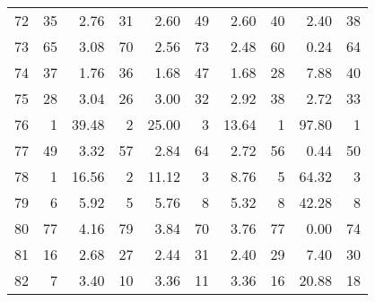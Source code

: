 \begin{table}[ht]
\begin{tabular}{rrrrrrrrrr}
  72 &  35 & 2.76 &  31 & 2.60 &  49 & 2.60 &  40 & 2.40 &  38 \\ 
  73 &  65 & 3.08 &  70 & 2.56 &  73 & 2.48 &  60 & 0.24 &  64 \\ 
  74 &  37 & 1.76 &  36 & 1.68 &  47 & 1.68 &  28 & 7.88 &  40 \\ 
  75 &  28 & 3.04 &  26 & 3.00 &  32 & 2.92 &  38 & 2.72 &  33 \\ 
  76 &   1 & 39.48 &   2 & 25.00 &   3 & 13.64 &   1 & 97.80 &   1 \\ 
  77 &  49 & 3.32 &  57 & 2.84 &  64 & 2.72 &  56 & 0.44 &  50 \\ 
  78 &   1 & 16.56 &   2 & 11.12 &   3 & 8.76 &   5 & 64.32 &   3 \\ 
  79 &   6 & 5.92 &   5 & 5.76 &   8 & 5.32 &   8 & 42.28 &   8 \\ 
  80 &  77 & 4.16 &  79 & 3.84 &  70 & 3.76 &  77 & 0.00 &  74 \\ 
  81 &  16 & 2.68 &  27 & 2.44 &  31 & 2.40 &  29 & 7.40 &  30 \\ 
  82 &   7 & 3.40 &  10 & 3.36 &  11 & 3.36 &  16 & 20.88 &  18 \\ 
   \hline
\end{tabular}
\end{table}
